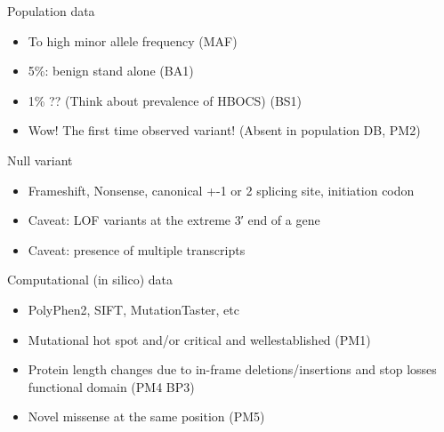 \documentclass[
  ignorenonframetext,
]{beamer}
\providecommand{\tightlist}{%
  \setlength{\itemsep}{0pt}\setlength{\parskip}{0pt}}
\begin{document}
\begin{frame}{Population data}
\protect\hypertarget{population-data-1}{}

\begin{itemize}
\tightlist
\item
  To high minor allele frequency (MAF)
\item
  5\%: benign stand alone (BA1)\\
\item
  1\% ?? (Think about prevalence of HBOCS) (BS1)\\
\item
  Wow! The first time observed variant! (Absent in population DB, PM2)
\end{itemize}

\end{frame}

\begin{frame}{Null variant}
\protect\hypertarget{null-variant}{}

\begin{itemize}
\tightlist
\item
  Frameshift, Nonsense, canonical +-1 or 2 splicing site, initiation
  codon
\item
  Caveat: LOF variants at the extreme 3′ end of a gene\\
\item
  Caveat: presence of multiple transcripts
\end{itemize}

\end{frame}

\begin{frame}{Computational (in silico) data}
\protect\hypertarget{computational-in-silico-data}{}

\begin{itemize}
\tightlist
\item
  PolyPhen2, SIFT, MutationTaster, etc\\
\item
  Mutational hot spot and/or critical and wellestablished (PM1)\\
\item
  Protein length changes due to in-frame deletions/insertions and stop
  losses functional domain (PM4 BP3)\\
\item
  Novel missense at the same position (PM5)
\end{itemize}

\end{frame}
\end{document}
